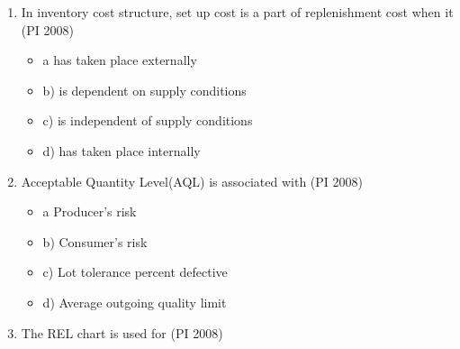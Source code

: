 \documentclass[journal,12pt,onecolumn]{IEEEtran}
\theoremstyle{remark}
\begin{document}
\begin{enumerate}
\vspace{1cm}
\item %
In inventory cost structure, set up cost is a part of  replenishment cost when it
    \hfill{(PI 2008)}
    \begin{itemize}[label={}]
        \item a has taken place externally
        \item b) is dependent on supply conditions
        \item c) is independent of supply conditions
        \item d) has taken place internally
    \end{itemize}
    \vspace{1cm}
    \item %
    Acceptable Quantity Level(AQL) is associated with
    \hfill{(PI 2008)}

\begin{itemize}
        \item a Producer's risk
        \item b) Consumer's risk
        \item c) Lot tolerance percent defective
        \item d) Average outgoing quality limit
    \end{itemize}
\vspace{1cm}
\item %
The REL chart is used for 
    \hfill{(PI 2008)}


\end{enumerate}
\end{document}
